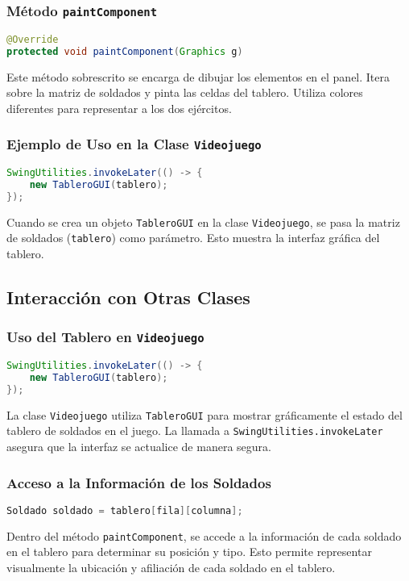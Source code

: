 \subsubsection{Método \texttt{paintComponent}}
\begin{lstlisting}[language=Java]
@Override
protected void paintComponent(Graphics g)
\end{lstlisting}
Este método sobrescrito se encarga de dibujar los elementos en el panel. Itera sobre la matriz de soldados y pinta las celdas del tablero. Utiliza colores diferentes para representar a los dos ejércitos.

\subsubsection{Ejemplo de Uso en la Clase \texttt{Videojuego}}
\begin{lstlisting}[language=Java]
SwingUtilities.invokeLater(() -> {
    new TableroGUI(tablero);
});
\end{lstlisting}
Cuando se crea un objeto \texttt{TableroGUI} en la clase \texttt{Videojuego}, se pasa la matriz de soldados (\texttt{tablero}) como parámetro. Esto muestra la interfaz gráfica del tablero.

\subsection{Interacción con Otras Clases}

\subsubsection{Uso del Tablero en \texttt{Videojuego}}
\begin{lstlisting}[language=Java]
SwingUtilities.invokeLater(() -> {
    new TableroGUI(tablero);
});
\end{lstlisting}
La clase \texttt{Videojuego} utiliza \texttt{TableroGUI} para mostrar gráficamente el estado del tablero de soldados en el juego. La llamada a \texttt{SwingUtilities.invokeLater} asegura que la interfaz se actualice de manera segura.

\subsubsection{Acceso a la Información de los Soldados}
\begin{lstlisting}[language=Java]
Soldado soldado = tablero[fila][columna];
\end{lstlisting}
Dentro del método \texttt{paintComponent}, se accede a la información de cada soldado en el tablero para determinar su posición y tipo. Esto permite representar visualmente la ubicación y afiliación de cada soldado en el tablero.

